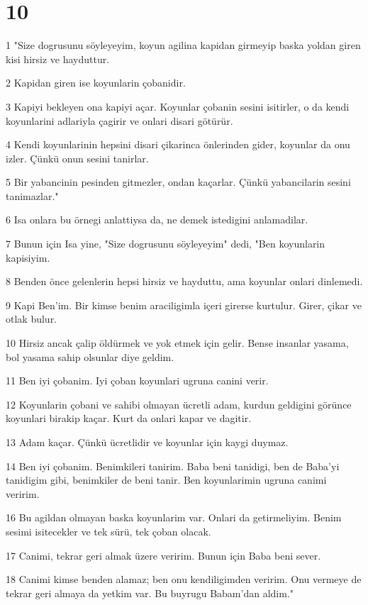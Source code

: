 \chapter{10}

\par 1 "Size dogrusunu söyleyeyim, koyun agilina kapidan girmeyip baska yoldan giren kisi hirsiz ve hayduttur.
\par 2 Kapidan giren ise koyunlarin çobanidir.
\par 3 Kapiyi bekleyen ona kapiyi açar. Koyunlar çobanin sesini isitirler, o da kendi koyunlarini adlariyla çagirir ve onlari disari götürür.
\par 4 Kendi koyunlarinin hepsini disari çikarinca önlerinden gider, koyunlar da onu izler. Çünkü onun sesini tanirlar.
\par 5 Bir yabancinin pesinden gitmezler, ondan kaçarlar. Çünkü yabancilarin sesini tanimazlar."
\par 6 Isa onlara bu örnegi anlattiysa da, ne demek istedigini anlamadilar.
\par 7 Bunun için Isa yine, "Size dogrusunu söyleyeyim" dedi, "Ben koyunlarin kapisiyim.
\par 8 Benden önce gelenlerin hepsi hirsiz ve hayduttu, ama koyunlar onlari dinlemedi.
\par 9 Kapi Ben'im. Bir kimse benim araciligimla içeri girerse kurtulur. Girer, çikar ve otlak bulur.
\par 10 Hirsiz ancak çalip öldürmek ve yok etmek için gelir. Bense insanlar yasama, bol yasama sahip olsunlar diye geldim.
\par 11 Ben iyi çobanim. Iyi çoban koyunlari ugruna canini verir.
\par 12 Koyunlarin çobani ve sahibi olmayan ücretli adam, kurdun geldigini görünce koyunlari birakip kaçar. Kurt da onlari kapar ve dagitir.
\par 13 Adam kaçar. Çünkü ücretlidir ve koyunlar için kaygi duymaz.
\par 14 Ben iyi çobanim. Benimkileri tanirim. Baba beni tanidigi, ben de Baba'yi tanidigim gibi, benimkiler de beni tanir. Ben koyunlarimin ugruna canimi veririm.
\par 16 Bu agildan olmayan baska koyunlarim var. Onlari da getirmeliyim. Benim sesimi isitecekler ve tek sürü, tek çoban olacak.
\par 17 Canimi, tekrar geri almak üzere veririm. Bunun için Baba beni sever.
\par 18 Canimi kimse benden alamaz; ben onu kendiligimden veririm. Onu vermeye de tekrar geri almaya da yetkim var. Bu buyrugu Babam'dan aldim."
